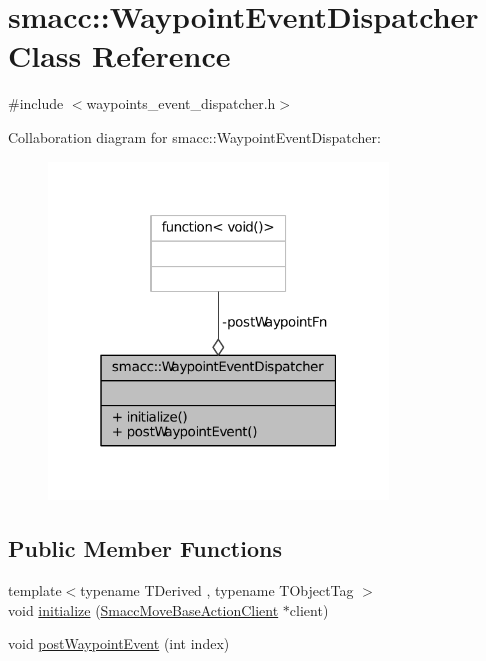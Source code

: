\hypertarget{classsmacc_1_1WaypointEventDispatcher}{}\section{smacc\+:\+:Waypoint\+Event\+Dispatcher Class Reference}
\label{classsmacc_1_1WaypointEventDispatcher}


{\ttfamily \#include $<$waypoints\+\_\+event\+\_\+dispatcher.\+h$>$}



Collaboration diagram for smacc\+:\+:Waypoint\+Event\+Dispatcher\+:
\nopagebreak
\begin{figure}[H]
\begin{center}
\leavevmode
\includegraphics[width=256pt]{classsmacc_1_1WaypointEventDispatcher__coll__graph}
\end{center}
\end{figure}
\subsection*{Public Member Functions}
\begin{DoxyCompactItemize}
\item 
{\footnotesize template$<$typename T\+Derived , typename T\+Object\+Tag $>$ }\\void \hyperlink{classsmacc_1_1WaypointEventDispatcher_a583966b07c927526f592437da657f24a}{initialize} (\hyperlink{classsmacc_1_1SmaccMoveBaseActionClient}{Smacc\+Move\+Base\+Action\+Client} $\ast$client)
\item 
void \hyperlink{classsmacc_1_1WaypointEventDispatcher_a6bd85034cb55795930741301a6077fe5}{post\+Waypoint\+Event} (int index)
\end{DoxyCompactItemize}
